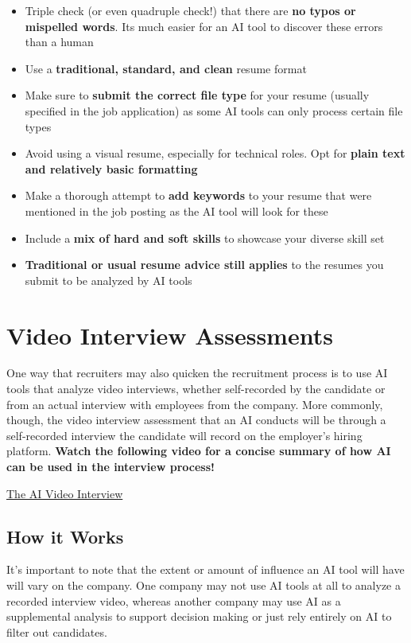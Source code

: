 \documentclass[
]{book}
\begin{document}
\begin{itemize}
\item
  Triple check (or even quadruple check!) that there are \textbf{no typos or mispelled words}. It\textquotesingle s much easier for an AI tool to discover these errors than a human
\item
  Use a \textbf{traditional, standard, and clean} resume format
\item
  Make sure to \textbf{submit the correct file type} for your resume (usually specified in the job application) as some AI tools can only process certain file types
\item
  Avoid using a visual resume, especially for technical roles. Opt for \textbf{plain text and relatively basic formatting}
\item
  Make a thorough attempt to \textbf{add keywords} to your resume that were mentioned in the job posting as the AI tool will look for these
\item
  Include a \textbf{mix of hard and soft skills} to showcase your diverse skill set
\item
  \textbf{Traditional or usual resume advice still applies} to the resumes you submit to be analyzed by AI tools
\end{itemize}

\hypertarget{video-interview-assessments}{%
\chapter{Video Interview Assessments}\label{video-interview-assessments}}

One way that recruiters may also quicken the recruitment process is to use AI tools that analyze video interviews, whether self-recorded by the candidate or from an actual interview with employees from the company. More commonly, though, the video interview assessment that an AI conducts will be through a self-recorded interview the candidate will record on the employer's hiring platform. \textbf{Watch the following video for a concise summary of how AI can be used in the interview process!}

\href{https://www.youtube.com/watch?v=cJkHft032OE}{The AI Video Interview}

\hypertarget{how-it-works}{%
\section{How it Works}\label{how-it-works}}

It's important to note that the extent or amount of influence an AI tool will have will vary on the company. One company may not use AI tools at all to analyze a recorded interview video, whereas another company may use AI as a supplemental analysis to support decision making or just rely entirely on AI to filter out candidates.
\end{document}
